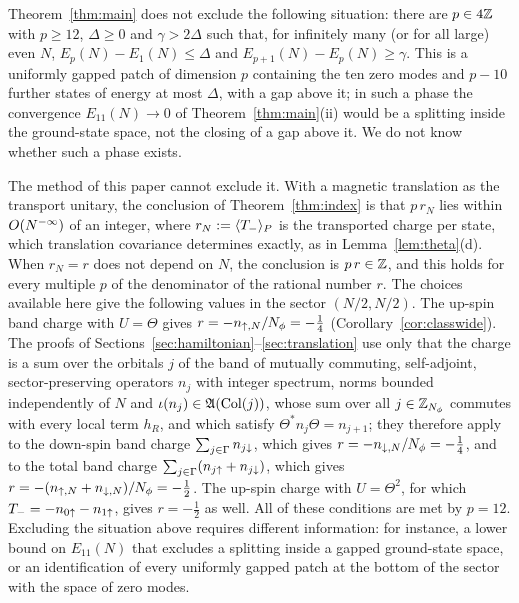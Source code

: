 \begin{remark}\label{rem:loophole}
Theorem~\ref{thm:main} does not exclude the following situation: there are $p\in4\mathbb{Z}$ with $p\ge12$, $\Delta\ge0$ and
$\gamma>2\Delta$ such that, for infinitely many (or for all large) even $N$, $E_p(N)-E_1(N)\le\Delta$ and
$E_{p+1}(N)-E_p(N)\ge\gamma$. This is a uniformly gapped patch of dimension $p$ containing the ten zero modes and
$p-10$ further states of energy at most $\Delta$, with a gap above it; in such a phase the convergence
$E_{11}(N)\to0$ of Theorem~\ref{thm:main}(ii) would be a splitting inside the ground-state space, not the closing of a
gap above it. We do not know whether such a phase exists.

The method of this paper cannot exclude it. With a magnetic translation as the transport unitary, the conclusion of
Theorem~\ref{thm:index} is that $p\,r_N$ lies within $O(N^{-\infty})$ of an integer, where $r_N:=\langle T_-\rangle_{P}$ is the transported
charge per state, which translation covariance determines exactly, as in Lemma~\ref{lem:theta}(d). When $r_N=r$ does
not depend on $N$, the conclusion is $p\,r\in\mathbb{Z}$, and this holds for every multiple $p$ of the denominator of the
rational number $r$. The choices available here give the following values in the sector $(N/2,N/2)$. The up-spin band
charge with $U=\Theta$ gives $r=-n_{{\uparrow},N}/N_{\phi}=-\frac14$ (Corollary~\ref{cor:classwide}). The proofs of
Sections~\ref{sec:hamiltonian}--\ref{sec:translation} use only that the charge is a sum over the orbitals $j$ of the band
of mutually commuting, self-adjoint, sector-preserving operators $n_j$ with integer spectrum, norms bounded
independently of $N$ and $\iota(n_j)\in\mathfrak{A}(\mathrm{Col}(j))$, whose sum over all $j\in\mathbb{Z}_{N_{\phi}}$ commutes with every local
term $h_R$, and which satisfy $\Theta^*n_j\Theta=n_{j+1}$; they
therefore apply to the down-spin band charge $\sum_{j\in\Gamma}n_{j{\downarrow}}$, which gives $r=-n_{{\downarrow},N}/N_{\phi}=-\frac14$,
and to the total band charge $\sum_{j\in\Gamma}(n_{j{\uparrow}}+n_{j{\downarrow}})$, which gives $r=-(n_{{\uparrow},N}+n_{{\downarrow},N})/N_{\phi}=-\frac12$. The
up-spin charge with $U=\Theta^2$, for which $T_-=-n_{0{\uparrow}}-n_{1{\uparrow}}$, gives $r=-\frac12$ as well. All of these conditions are
met by $p=12$. Excluding the situation above requires different information: for instance, a lower bound on $E_{11}(N)$
that excludes a splitting inside a gapped ground-state space, or an identification of every uniformly gapped patch at
the bottom of the sector with the space of zero modes.
\end{remark}

